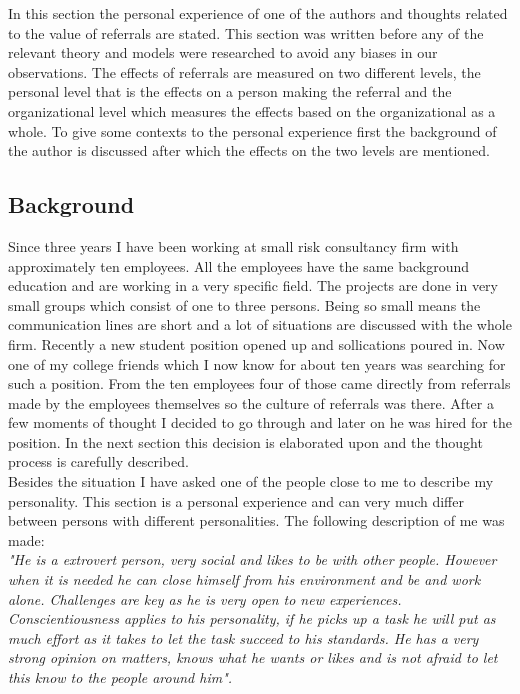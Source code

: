 \documentclass[Main.tex]{subfiles}
\begin{document}
In this section the personal experience of one of the authors and thoughts related to the value of referrals are stated. This section was written before any of the relevant theory and models were researched to avoid any biases in our observations. The effects of referrals are measured on two different levels, the personal level that is the effects on a person making the referral and the organizational level which measures the effects based on the organizational as a whole. To give some contexts to the personal experience first the background of the author is discussed after which the effects on the two levels are mentioned.

\subsection*{Background}

 Since three years I have been working at small risk consultancy firm with approximately ten employees. All the employees have the same background education and are working in a very specific field. The projects are done in very small groups which consist of one to three persons. Being so small means the communication lines are short and a lot of situations are discussed with the whole firm. Recently a new student position opened up and sollications poured in.  Now one of my college friends which I now know for about ten years was searching for such a position. From the ten employees four of those came directly from referrals made by the employees themselves so the culture of referrals was there. After a few moments of thought I decided to go through and later on he was hired for the position. In the next section this decision is elaborated upon and the thought process is carefully described. \\

Besides the situation I have asked one of the people close to me to describe my personality. This section is a personal experience and can very much differ between persons with different personalities. The following description of me was made: \\

\emph{"He is a extrovert person, very social and likes to be with other people. However when it is needed he can close himself from his environment and be and work alone. Challenges are key as he is very open to new experiences. Conscientiousness applies to his personality, if he picks up a task he will put as much effort as it takes to let the task succeed to his standards. He has a very strong opinion on matters, knows what he wants or likes and is not afraid to let this know to the people around him".}
\end{document}
